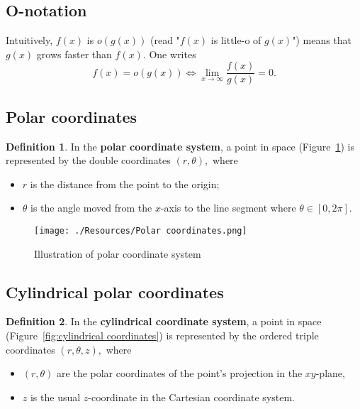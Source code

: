 \documentclass[12pt, a4paper]{article}
\newcommand{\f}[2]{\frac{#1}{#2}}
\theoremstyle{definition}
\newtheorem{definition}{Definition}[section]
\theoremstyle{plain}
\begin{document}
\subsection{O-notation}

 Intuitively, $f(x)$ is $o(g(x))$ (read "$f(x)$ is little-o of $g(x)$") means that $g(x)$ grows faster than $f(x).$ One writes $$f(x)=o(g(x)) \iff \lim_{x \to \infty} \f{f(x)}{g(x)}=0.$$

\subsection{Polar coordinates}

\begin{definition}
In the \textbf{polar coordinate system}, a point in space (Figure~\ref{fig:polar coordinates}) is represented by the double coordinates $(r,\theta),$ where \begin{itemize}

	\item $r$ is the distance from the point to the origin;

	\item $\theta$ is the angle moved from the $x$-axis to the line segment where $\theta \in [0,2\pi].$

\end{itemize}
\end{definition}

\begin{figure}[H]
\centering
\texttt{[image: ./Resources/Polar coordinates.png]}
\caption{Illustration of polar coordinate system}
\label{fig:polar coordinates}
\end{figure}

\subsection{Cylindrical polar coordinates}

\begin{definition}
In the \textbf{cylindrical coordinate system}, a point in space (Figure~\ref{fig:cylindrical coordinates}) is represented by the ordered triple coordinates $(r, \theta,z),$ where \begin{itemize}
 	\item $(r,\theta)$ are the polar coordinates of the point's projection in the $xy$-plane,
 	\item $z$ is the usual $z$-coordinate in the Cartesian coordinate system. 	
\end{itemize}
\end{definition}
\end{document}
